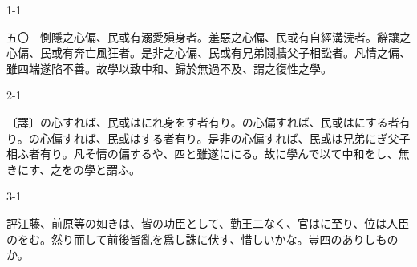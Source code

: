 \documentclass[tate,paper=b6j,jafontsize=9pt]{jlreq}
\begin{document}
\begin{azconvIndented}{1\zw}{-1\zw}

五〇　惻隱之心偏、民或有溺愛殞身者。羞惡之心偏、民或有自經溝涜者。辭讓之心偏、民或有奔亡風狂者。是非之心偏、民或有兄弟鬩牆父子相訟者。凡情之偏、雖四端遂陷不善。故學以致中和、歸於無過不及、謂之復性之學。

\end{azconvIndented}
\begin{azconvIndented}{2\zw}{-1\zw}

〔譯〕の心すれば、民或はにれ身をす者有り。の心偏すれば、民或はにする者有り。の心偏すれば、民或はする者有り。是非の心偏すれば、民或は兄弟にぎ父子相ふ者有り。凡そ情の偏するや、四と雖遂ににる。故に學んで以て中和をし、無きにす、之をの學と謂ふ。

\end{azconvIndented}
\begin{azconvIndented}{3\zw}{-1\zw}

評江藤、前原等の如きは、皆の功臣として、勤王二なく、官はに至り、位は人臣のをむ。然り而して前後皆亂を爲し誅に伏す、惜しいかな。豈四のありしものか。

\end{azconvIndented}
\end{document}
